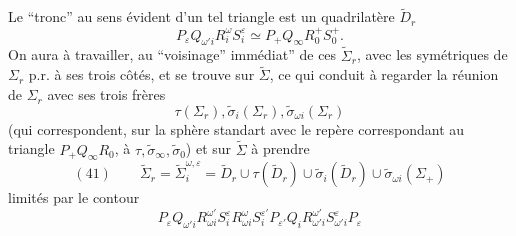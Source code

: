 Le ``tronc''  au sens évident d'un tel triangle est un quadrilatère $\widetilde D_r$
\[
P_\varepsilon Q_{\omega'i}R_i^\omega S_i^\varepsilon\simeq P_+Q_\infty R_0^+S_0^+.
\]
On aura à travailler, au ``voisinage'' immédiat'' de ces    $\widetilde\Sigma_r$, avec les symétriques de $\Sigma_r$ p.r. à ses trois côtés, et se trouve sur $\widetilde\Sigma$,  ce qui conduit à regarder la réunion de $\Sigma_r$ avec ses trois frères
\[
\tau(\Sigma_r),\widetilde\sigma_i(\Sigma_r),\widetilde\sigma_{\omega i}(\Sigma_r)
\]
(qui  correspondent, sur la sphère standart avec le repère correspondant au triangle $P_+Q_\infty R_0$, à $\tau,\widetilde\sigma_\infty,\widetilde\sigma_0$) et sur $\widetilde\Sigma$ à prendre
\[
(41)\qquad\widetilde\Sigma_r=\widetilde\Sigma_i^{\omega,\varepsilon}=\widetilde D_r\cup\tau(\widetilde D_r)\cup\widetilde\sigma_i(\widetilde D_r)\cup\widetilde\sigma_{\omega i}(\Sigma_+)
\]
limités par le contour
\[
P_\varepsilon Q_{\omega'i}R_{\omega i}^{\omega'}S_i^\varepsilon R_{\omega i}^{\omega}S_i^{\varepsilon'}P_{\varepsilon'}Q_iR_{\omega'i}^{\omega'}S_{\omega'i}^\varepsilon P_\varepsilon
\]

